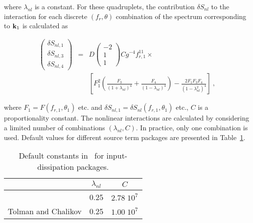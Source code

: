 \noindent
where $\lambda_{nl}$ is a constant. For these quadruplets, the contribution
$\delta S_{nl}$ to the interaction for each discrete $(f_r,\theta)$
combination of the spectrum corresponding to $\mbox{\bf k}_1$ is calculated as


\begin{eqnarray}
\left ( \begin{array}{c}
  \delta S_{nl,1} \\ \delta S_{nl,3} \\ \delta S_{nl,4}
\end{array} \right ) & = & D
\left ( \begin{array}{r} -2 \\ 1 \\ 1 \end{array} \right )
C g^{-4} f_{r,1}^{11} \times \nonumber \\
& & \left [ F_1^2
\left ( \frac{F_3}{(1+\lambda_{nl})^4} +
        \frac{F_4}{(1-\lambda_{nl})^4} \right ) -
\frac{2 F_1 F_3 F_4}{(1-\lambda_{nl}^2)^4}
\right ] \: , \label{eq:snl_dia}
\end{eqnarray}

\noindent
where $F_1 = F(f_{r,1} ,\theta_1 )$ etc. and $\delta S_{nl,1} = \delta
S_{nl}(f_{r,1} ,\theta_1 )$ etc., $C$ is a proportionality constant. The
nonlinear interactions are calculated by considering a limited number of
combinations $(\lambda_{nl},C)$. In practice, only one combination is
used. Default values for different source term packages are presented in
Table~\ref{tab:snl_par}.



\begin{table} \begin{center}
 \begin{tabular}{|l|c|c|} \hline \hline
                    & $\lambda_{nl}$ &     $C$      \\ \hline
\wam-3              &      0.25      & $2.78 \; 10^7$  \\ \hline
Tolman and Chalikov &      0.25      & $1.00 \; 10^7$  \\ \hline \hline
\end{tabular} \end{center}
\caption{Default constants in \dia\ for input-dissipation packages.}
\label{tab:snl_par} \botline \end{table}

